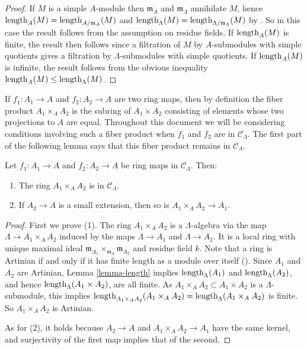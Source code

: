 \begin{proof}
If $M$ is a simple $A$-module then $\mathfrak{m}_{A}$ and 
$\mathfrak{m}_{\Lambda}$ annihilate $M$, hence $\textnormal{length}_{A}(M) = 
\textnormal{length}_{A/\mathfrak{m}_A}(M)$ and 
$\textnormal{length}_{\Lambda}(M) = 
\textnormal{length}_{\Lambda/\mathfrak{m}_{\Lambda}}(M)$ by \cite[Lemma 
7.45.6]{stacks-project}.  So in this case the result follows from the 
assumption on residue fields.  If $\textnormal{length}_{A}(M)$ is finite, the 
result then follows since a filtration of $M$ by $A$-submodules with simple 
quotients gives a filtration by $\Lambda$-submodules with simple quotients. If 
$\textnormal{length}_{A}(M)$ is infinite, the result follows from the obvious 
inequality $\textnormal{length}_{A}(M) \leq \textnormal{length}_{\Lambda}(M)$.
\end{proof}

\noindent
If $f_1: A_1 \rightarrow A$ and $f_2: A_2 \rightarrow A$ are two ring maps, 
then by definition the fiber product $A_1 \times_{A} A_2$ is the subring of 
$A_1 \times A_2$ consisting of elements whose two projections to $A$ are equal. 
Throughout this document we will be considering conditions involving such a 
fiber product when $f_1$ and $f_2$ are in $\mathcal C_{\Lambda}$.  The first 
part of the following lemma says that this fiber product remains in $\mathcal 
C_{\Lambda}$.
\begin{lemma}
\label{lemma-fiber-product-CLambda}
Let $f_1 : A_1 \rightarrow A$ and $f_2 : A_2 \rightarrow A$ be ring maps in 
$\mathcal C_{\Lambda}$. Then:
\begin{enumerate}
\item The ring $A_1 \times_{A} A_2$ is in $\mathcal C_{\Lambda}$.
\item If $A_2 \rightarrow A$ is a small extension, then so is $A_1 \times_{A} 
A_2 \rightarrow A_1$.
\end{enumerate}
\end{lemma}

\begin{proof}
First we prove (1).  The ring $A_1 \times_{A} A_2$ is a $\Lambda$-algebra via 
the map $\Lambda \rightarrow A_1 \times_{A} A_2$ induced by the maps $\Lambda 
\rightarrow A_1$ and $\Lambda \rightarrow A_2$.  It is a local ring with unique 
maximal ideal $\mathfrak{m}_{A_1} \times_{\mathfrak{m}_{A}} \mathfrak{m}_{A_2}$ 
and residue field $k$. Note that a ring is Artinian if and only if it has 
finite length as a module over itself (\cite[Lemma 7.46.8]{stacks-project}).  
Since $A_1$ and $A_2$ are Artinian, Lemma \ref{lemma-length} implies 
$\textnormal{length}_{\Lambda}(A_1)$ and $\textnormal{length}_{\Lambda}(A_2)$, 
and hence $\textnormal{length}_{\Lambda}(A_1 \times A_2)$, are all finite.  As 
$A_1 \times_A A_2 \subset A_1 \times A_2$ is a $\Lambda$-submodule, this 
implies $\textnormal{length}_{A_1 \times_A A_2}(A_1 \times_{A} A_2) = 
\textnormal{length}_{\Lambda}(A_1 \times_{A} A_2)$ is finite. So $A_1 
\times_{A} A_2$ is Artinian.

\medskip \noindent
As for (2), it holds because $A_2 \rightarrow A$ and $A_1 \times_{A} A_2 
\rightarrow A_1$ have the same kernel, and surjectivity of the first map 
implies that of the second.
\end{proof}

